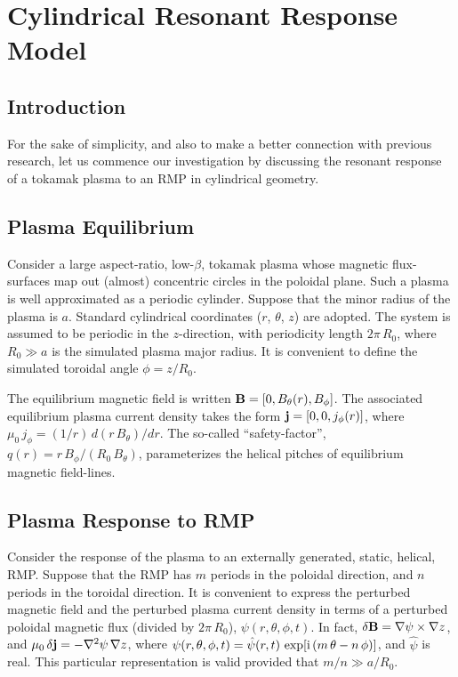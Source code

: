 \documentclass[12pt,prb,aps]{revtex4-1}
\begin{document}
\section{Cylindrical Resonant Response Model}\label{s2}
\subsection{Introduction}
For the sake of simplicity, and also to make a better connection with previous research, let us commence our investigation by discussing
the resonant response of a tokamak plasma to an RMP in cylindrical geometry. 

\subsection{Plasma Equilibrium}
Consider a large aspect-ratio, low-$\beta$, tokamak plasma whose magnetic flux-surfaces map out (almost)
concentric circles in the poloidal plane.
Such a plasma is well approximated as a periodic cylinder.  Suppose that the minor radius of the plasma
is $a$. Standard cylindrical coordinates ($r$, $\theta$, $z$) are adopted. The system is assumed to
be periodic in the $z$-direction, with periodicity length $2\pi\,R_0$, where $R_0\gg a$ is the simulated
plasma major radius. It is convenient to define the simulated toroidal angle $\phi=z/R_0$. 

The equilibrium magnetic field is written ${\bf B} = [0,B_\theta(r), B_\phi]$. The associated equilibrium
plasma current density takes the form ${\bf j} =[0,0,j_\phi(r)]$, where $\mu_0\,j_\phi= (1/r)\,d(r\,B_\theta)/dr$. The
so-called ``safety-factor'', $q(r)=r\,B_\phi/(R_0\,B_\theta)$, parameterizes the helical pitches of equilibrium magnetic
field-lines. 

\subsection{Plasma Response to RMP}
Consider the response of the plasma to an externally generated, static, helical, RMP. 
Suppose that the RMP has $m$ periods in the poloidal direction, and $n$ periods in the toroidal direction.
It is convenient to express the perturbed magnetic field and the perturbed plasma current density in
terms of a perturbed poloidal magnetic flux (divided by $2\pi\,R_0$), $\psi(r,\theta,\phi,t)$. In fact, $\delta{\bf B} = \nabla\psi\times \nabla z$, 
and $\mu_0\,\delta {\bf j} = - \nabla^2\psi\,\nabla z$,
where $\psi(r,\theta,\phi,t) = \hat{\psi}(r,t)\,\exp[{\rm i}\,(m\,\theta-n\,\phi)]$, and $\hat{\psi}$ is real. This particular representation
is valid provided that $m/n\gg a/R_0$.\cite{rfa}
\end{document}
